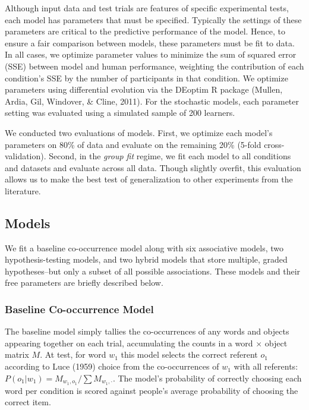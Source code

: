 \documentclass[10pt, letterpaper]{article}
\begin{document}
Although input data and test trials are features of specific
experimental tests, each model has parameters that must be specified.
Typically the settings of these parameters are critical to the
predictive performance of the model. Hence, to ensure a fair comparison
between models, these parameters must be fit to data. In all cases, we
optimize parameter values to minimize the sum of squared error (SSE)
between model and human performance, weighting the contribution of each
condition's SSE by the number of participants in that condition. We
optimize parameters using differential evolution via the DEoptim R
package (Mullen, Ardia, Gil, Windover, \& Cline, 2011). For the
stochastic models, each parameter setting was evaluated using a
simulated sample of 200 learners.

We conducted two evaluations of models. First, we optimize each model's
parameters on 80\% of data and evaluate on the remaining 20\% (5-fold
cross-validation). Second, in the \emph{group fit} regime, we fit each
model to all conditions and datasets and evaluate across all data.
Though slightly overfit, this evaluation allows us to make the best test
of generalization to other experiments from the literature.

\hypertarget{models}{%
\subsection{Models}\label{models}}

We fit a baseline co-occurrence model along with six associative models,
two hypothesis-testing models, and two hybrid models that store
multiple, graded hypotheses--but only a subset of all possible
associations. These models and their free parameters are briefly
described below.

\hypertarget{baseline-co-occurrence-model}{%
\subsubsection{Baseline Co-occurrence
Model}\label{baseline-co-occurrence-model}}

The baseline model simply tallies the co-occurrences of any words and
objects appearing together on each trial, accumulating the counts in a
word \(\times\) object matrix \(M\). At test, for word \(w_1\) this
model selects the correct referent \(o_1\) according to Luce (1959)
choice from the co-occurrences of \(w_1\) with all referents:
\(P(o_1|w_1) = M_{w_1,o_1} / \sum{M_{w_1,\cdot}}\). The model's
probability of correctly choosing each word per condition is scored
against people's average probability of choosing the correct item.
\end{document}
